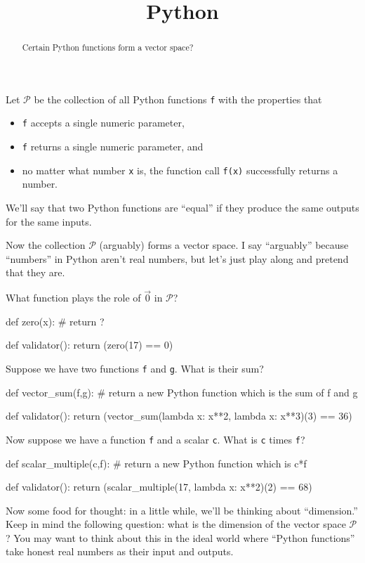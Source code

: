 \documentclass{ximera}
\title{Python}
\begin{document}
\begin{abstract}
  Certain Python functions form a vector space?
\end{abstract}

Let $\mathcal{P}$ be the collection of all Python functions \texttt{f} with the properties that
\begin{itemize}
\item \texttt{f} accepts a single numeric parameter,
\item \texttt{f} returns a single numeric parameter, and
\item no matter what number \texttt{x} is, the function call \texttt{f(x)} successfully returns a number.
\end{itemize}
We'll say that two Python functions are ``equal'' if they produce the same outputs for the same inputs.

Now the collection $\mathcal{P}$ (arguably) forms a vector space.  I
say ``arguably'' because ``numbers'' in Python aren't real numbers,
but let's just play along and pretend that they are.

\begin{question}
  What function plays the role of $\vec{0}$ in $\mathcal{P}$?
  \begin{solution}
    \begin{python}
def zero(x):
  # return ?  
    
def validator():
  return (zero(17) == 0)
    \end{python}
  \end{solution}

  Suppose we have two functions \texttt{f} and \texttt{g}.  What is their sum?
  \begin{solution}
    \begin{python}
def vector_sum(f,g):
  # return a new Python function which is the sum of f and g
    
def validator():
  return (vector_sum(lambda x: x**2, lambda x: x**3)(3) == 36)
    \end{python}
  \end{solution}

  Now suppose we have a function \texttt{f} and a scalar \texttt{c}.  What is \texttt{c} times \texttt{f}?
  \begin{solution}
    \begin{python}
def scalar_multiple(c,f):
  # return a new Python function which is c*f
    
def validator():
  return (scalar_multiple(17, lambda x: x**2)(2) == 68)
    \end{python}
  \end{solution}

  Now some food for thought: in a little while, we'll be thinking
  about ``dimension.''  Keep in mind the following question: what is
  the dimension of the vector space $\mathcal{P}$?  You may want to
  think about this in the ideal world where ``Python functions'' take
  honest real numbers as their input and outputs.
\end{question}
\end{document}
